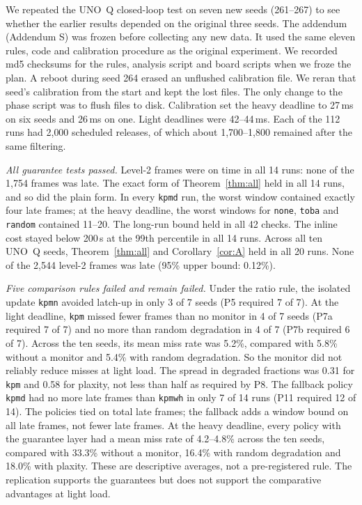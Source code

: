 \documentclass[acmsmall,screen]{acmart}
\newcommand{\pol}[1]{\texttt{#1}}
\begin{document}
We repeated the UNO~Q closed-loop test on seven new seeds (261--267) to see whether the earlier results depended on the original three seeds. The addendum (Addendum S) was frozen before collecting any new data. It used the same eleven rules, code and calibration procedure as the original experiment. We recorded md5 checksums for the rules, analysis script and board scripts when we froze the plan. A reboot during seed 264 erased an unflushed calibration file. We reran that seed's calibration from the start and kept the lost files. The only change to the phase script was to flush files to disk. Calibration set the heavy deadline to 27\,ms on six seeds and 26\,ms on one. Light deadlines were 42--44\,ms. Each of the 112 runs had 2{,}000 scheduled releases, of which about 1{,}700--1{,}800 remained after the same filtering.

\emph{All guarantee tests passed.} Level-2 frames were on time in all 14 runs: none of the 1{,}754 frames was late. The exact form of Theorem~\ref{thm:all} held in all 14 runs, and so did the plain form. In every \pol{kpmd} run, the worst window contained exactly four late frames; at the heavy deadline, the worst windows for \pol{none}, \pol{toba} and \pol{random} contained 11--20. The long-run bound held in all 42 checks. The inline cost stayed below 200\,\textmu s at the 99th percentile in all 14 runs. Across all ten UNO~Q seeds, Theorem~\ref{thm:all} and Corollary~\ref{cor:A} held in all 20 runs. None of the 2{,}544 level-2 frames was late (95\% upper bound: 0.12\%).

\emph{Five comparison rules failed and remain failed.} Under the ratio rule, the isolated update \pol{kpmn} avoided latch-up in only 3 of 7 seeds (P5 required 7 of 7). At the light deadline, \pol{kpm} missed fewer frames than no monitor in 4 of 7 seeds (P7a required 7 of 7) and no more than random degradation in 4 of 7 (P7b required 6 of 7). Across the ten seeds, its mean miss rate was 5.2\%, compared with 5.8\% without a monitor and 5.4\% with random degradation. So the monitor did not reliably reduce misses at light load. The spread in degraded fractions was 0.31 for \pol{kpm} and 0.58 for plaxity, not less than half as required by P8. The fallback policy \pol{kpmd} had no more late frames than \pol{kpmwh} in only 7 of 14 runs (P11 required 12 of 14). The policies tied on total late frames; the fallback adds a window bound on all late frames, not fewer late frames. At the heavy deadline, every policy with the guarantee layer had a mean miss rate of 4.2--4.8\% across the ten seeds, compared with 33.3\% without a monitor, 16.4\% with random degradation and 18.0\% with plaxity. These are descriptive averages, not a pre-registered rule. The replication supports the guarantees but does not support the comparative advantages at light load.
\end{document}
